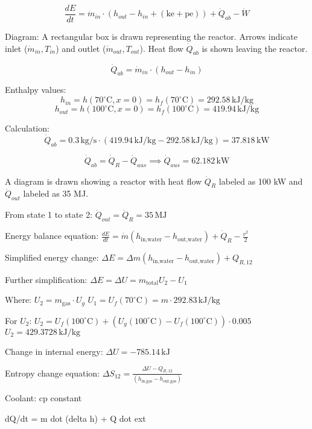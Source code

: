 \[
\frac{dE}{dt} = \dot{m}_{in} \cdot (h_{out} - h_{in} + (\text{ke} + \text{pe})) + \dot{Q}_{ab} - \dot{W}
\]  

Diagram:  
A rectangular box is drawn representing the reactor. Arrows indicate inlet (\( \dot{m}_{in}, T_{in} \)) and outlet (\( \dot{m}_{out}, T_{out} \)). Heat flow \( \dot{Q}_{ab} \) is shown leaving the reactor.  

\[
\dot{Q}_{ab} = \dot{m}_{in} \cdot (h_{out} - h_{in})
\]  

Enthalpy values:  
\[
h_{in} = h(70^\circ \text{C}, x = 0) = h_f(70^\circ \text{C}) = 292.58 \, \text{kJ/kg}
\]  
\[
h_{out} = h(100^\circ \text{C}, x = 0) = h_f(100^\circ \text{C}) = 419.94 \, \text{kJ/kg}
\]  

Calculation:  
\[
\dot{Q}_{ab} = 0.3 \, \text{kg/s} \cdot (419.94 \, \text{kJ/kg} - 292.58 \, \text{kJ/kg}) = 37.818 \, \text{kW}
\]  

\[
\dot{Q}_{ab} = \dot{Q}_R - \dot{Q}_{aus} \implies \dot{Q}_{aus} = 62.182 \, \text{kW}
\]

A diagram is drawn showing a reactor with heat flow \( \dot{Q}_R \) labeled as 100 kW and \( \dot{Q}_{out} \) labeled as 35 MJ.  

From state 1 to state 2:  
\( \dot{Q}_{out} = \dot{Q}_R = 35 \, \text{MJ} \)  

Energy balance equation:  
\( \frac{dE}{dt} = \dot{m} (h_{\text{in,water}} - h_{\text{out,water}}) + \dot{Q}_R - \frac{v^2}{2} \)  

Simplified energy change:  
\( \Delta E = \Delta m (h_{\text{in,water}} - h_{\text{out,water}}) + Q_{R,12} \)  

Further simplification:  
\( \Delta E = \Delta U = m_{\text{total}} U_2 - U_1 \)  

Where:  
\( U_2 = m_{\text{gas}} \cdot U_g \)  
\( U_1 = U_f(70^\circ \text{C}) = m \cdot 292.83 \, \text{kJ/kg} \)  

For \( U_2 \):  
\( U_2 = U_f(100^\circ \text{C}) + (U_g(100^\circ \text{C}) - U_f(100^\circ \text{C})) \cdot 0.005 \)  
\( U_2 = 429.3728 \, \text{kJ/kg} \)  

Change in internal energy:  
\( \Delta U = -785.14 \, \text{kJ} \)  

Entropy change equation:  
\( \Delta S_{12} = \frac{\Delta U - Q_{R,12}}{(h_{\text{in,gas}} - h_{\text{out,gas}})} \)

Coolant:  
cp constant  

dQ/dt = m dot (delta h) + Q dot ext